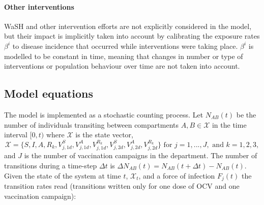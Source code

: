 \paragraph{Other interventions} WaSH and other intervention efforts are not explicitly considered in the model, but their impact is implicitly taken into account by calibrating the exposure rates $\beta^i$ to disease incidence that occurred while interventions were taking place. $\beta^i$ is modelled to be constant in time, meaning that changes in number or type of interventions or population behaviour over time are not taken into account\cite{Bertuzzo:ProbabilityExtinctionHaiti:2016}. %


\subsection{Model equations}\label{sec:stoch}
The model is implemented as a stochastic counting process\cite{Breto:TimeSeriesAnalysis:2009}. Let \(N_{AB}(t)\) be the number of individuals transiting between compartments \(A,B\in \mathcal{X}\) in the time interval \([0,t)\)  where $\mathcal{X}$ is the state vector,
$$\mathcal{X} = \{S, I, A, R_k, V^S_{j,1d},V^A_{j,1d}, V^{R_k}_{j,1d}, V^S_{j,2d},V^A_{j,2d}, V^{R_k}_{j,2d}\} 
\text{ for } j = 1, ..., J, \text{ and } k = 1, 2, 3,
$$
and $J$ is the number of vaccination campaigns in the department.
The number of transitions during a time-step $\Delta t$ is
\(\Delta N_{AB}(t) = N_{AB}(t+\Delta t) - N_{AB}(t)\). Given the state of the system at time \(t\), \(\mathcal{X}_t\), and a force of infection $F_j(t)$ the transition rates read (transitions written only for one dose of OCV and one vaccination campaign):
